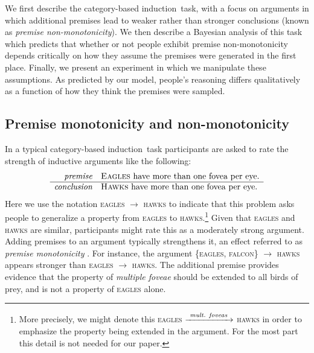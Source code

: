 \documentclass[doc,12pt]{apa}
\newcommand{\category}[1]{\textsc{#1}}
\newcommand{\cbi}{category-based induction}
\newcommand{\oneargument}[2]{{#1} $\rightarrow$ {#2}}
\newcommand{\oneverboseargument}[3]{{#1} $\xrightarrow{\mbox{~\scriptsize{#3}}~}$ {#2}}
\newcommand{\twoargument}[3]{\{{#1}, {#2}\} $\rightarrow$ {#3}}
\begin{document}
We first describe the \cbi\ task, with a focus on arguments in which additional premises lead to weaker rather than stronger conclusions (known as {\em premise non-monotonicity}). We then describe a Bayesian analysis of this task which predicts that whether or not people exhibit premise non-monotonicity depends critically on how they assume the premises were generated in the first place. Finally, we present an experiment in which we manipulate these assumptions. As predicted by our model, people's reasoning differs qualitatively as a function of how they think the premises were sampled.

\subsection{Premise monotonicity and non-monotonicity}

In a typical \cbi\ task participants are asked to rate the strength of
inductive arguments like the following:
%
\begin{equation*}
\begin{array}{rl}
\mbox{{\em premise}} & \mbox{\category{Eagles} have more than one fovea per eye.} \\
\hline
\mbox{{\em conclusion}} & \mbox{\category{Hawks} have more than one fovea per eye.}
\end{array}
\end{equation*}
%
Here we use the notation \oneargument{\category{eagles}}{\category{hawks}} to indicate that this problem
asks people to generalize a property from \category{eagles} to \category{hawks}.\footnote{More precisely, we might denote this \oneverboseargument{\category{eagles}}{\category{hawks}}{{\em mult. foveas}} in order to emphasize the property being extended in the argument. For the most part this detail is not needed for our paper.}
Given that \category{eagles} and \category{hawks} are similar, participants might rate this as a moderately strong argument. Adding premises to an argument typically strengthens it, an effect referred to as {\em premise
  monotonicity} \cite{Osh90}. For instance, the argument \twoargument{\category{eagles}}{\category{falcon}}{\category{hawks}}
appears stronger than \oneargument{\category{eagles}}{\category{hawks}}. The additional premise provides evidence that the property of {\em multiple foveae} should be extended to all birds of prey, and is not a property of \category{eagles} alone.
\end{document}
